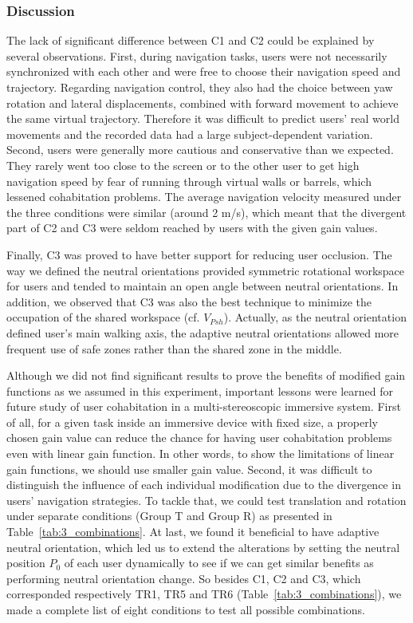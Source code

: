 \subsubsection{Discussion}
The lack of significant difference between C1 and C2 could be explained by several observations. First, during navigation tasks, users were not necessarily synchronized with each other and were free to choose their navigation speed and trajectory. Regarding navigation control, they also had the choice between yaw rotation and lateral displacements, combined with forward movement to achieve the same virtual trajectory. Therefore it was difficult to predict users' real world movements and the recorded data had a large subject-dependent variation. Second, users were generally more cautious and conservative than we expected. They rarely went too close to the screen or to the other user to get high navigation speed by fear of running through virtual walls or barrels, which lessened cohabitation problems. The average navigation velocity measured under the three conditions were similar (around 2 m/s), which meant that the divergent part of C2 and C3 were seldom reached by users with the given gain values.

Finally, C3 was proved to have better support for reducing user occlusion. The way we defined the neutral orientations provided symmetric rotational workspace for users and tended to maintain an open angle between neutral orientations. In addition, we observed that C3 was also the best technique to minimize the occupation of the shared workspace (cf. $V_{Psh}$). Actually, as the neutral orientation defined user's main walking axis, the adaptive neutral orientations allowed more frequent use of safe zones rather than the shared zone in the middle.

Although we did not find significant results to prove the benefits of modified gain functions as we assumed in this experiment, important lessons were learned for future study of user cohabitation in a multi-stereoscopic immersive system. First of all, for a given task inside an immersive device with fixed size, a properly chosen gain value can reduce the chance for having user cohabitation problems even with linear gain function. In other words, to show the limitations of linear gain functions, we should use smaller gain value. Second, it was difficult to distinguish the influence of each individual modification due to the divergence in users' navigation strategies. To tackle that, we could test translation and rotation under separate conditions (Group T and Group R) as presented in Table~\ref{tab:3_combinations}. At last, we found it beneficial to have adaptive neutral orientation, which led us to extend the alterations by setting the neutral position $P_{0}$ of each user dynamically to see if we can get similar benefits as performing neutral orientation change. So besides C1, C2 and C3, which corresponded respectively TR1, TR5 and TR6 (Table~\ref{tab:3_combinations}), we made a complete list of eight conditions to test all possible combinations.

